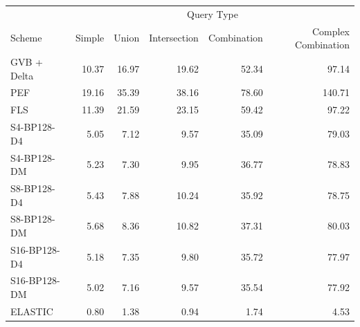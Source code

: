 \begin{tabular}{lrrrrr}
\toprule
 & \multicolumn{5}{c}{Query Type} \\
Scheme & Simple & Union & Intersection & Combination & Complex Combination \\
\midrule
GVB + Delta & 10.37 & 16.97 & 19.62 & 52.34 & 97.14 \\
PEF & 19.16 & 35.39 & 38.16 & 78.60 & 140.71 \\
FLS & 11.39 & 21.59 & 23.15 & 59.42 & 97.22 \\
S4-BP128-D4 & 5.05 & 7.12 & 9.57 & 35.09 & 79.03 \\
S4-BP128-DM & 5.23 & 7.30 & 9.95 & 36.77 & 78.83 \\
S8-BP128-D4 & 5.43 & 7.88 & 10.24 & 35.92 & 78.75 \\
S8-BP128-DM & 5.68 & 8.36 & 10.82 & 37.31 & 80.03 \\
S16-BP128-D4 & 5.18 & 7.35 & 9.80 & 35.72 & 77.97 \\
S16-BP128-DM & 5.02 & 7.16 & 9.57 & 35.54 & 77.92 \\
ELASTIC & 0.80 & 1.38 & 0.94 & 1.74 & 4.53 \\
\bottomrule
\end{tabular}
